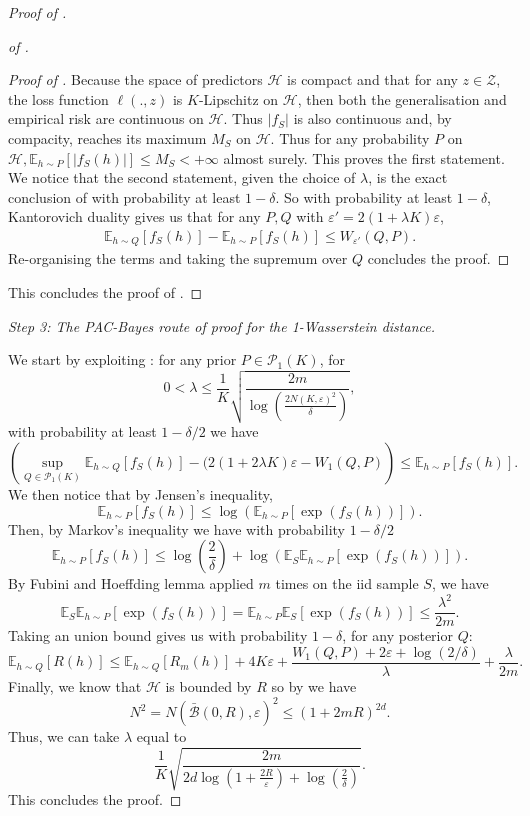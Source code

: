 \begin{proof}[Proof of ]
\begin{proof}[of ]
\begin{lemma}
\end{lemma}
\begin{proof}[Proof of ]
Because the space of predictors $\mathcal{H}$ is compact and that for any $z\in\mathcal{Z}$, the loss function $\ell(.,z)$ is $K$-Lipschitz on $\mathcal{H}$, then both the generalisation and empirical risk are continuous on $\mathcal{H}$. Thus $|f_S|$ is also continuous and, by compacity, reaches its maximum $M_S$ on $\mathcal{H}$. Thus for any probability $P$ on $\mathcal{H}, \mathbb{E}_{h\sim P}[|f_S(h)|] \leq M_S < +\infty$ almost surely. This proves the first statement.
We notice that the second statement, given the choice of $\lambda$, is the exact conclusion  of  with probability at least $1-\delta$.
So with probability at least $1-\delta$, Kantorovich duality gives us that for any $P,Q$ with $\varepsilon'= 2(1+ \lambda K) \varepsilon$,
\begin{align*}
\mathbb{E}_{h\sim Q}[ f_S(h)] - \mathbb{E}_{h\sim P}[f_S(h)] \leq W_{\varepsilon'}(Q,P).
\end{align*}
Re-organising the terms and taking the supremum over $Q$ concludes the proof.
\end{proof}
This concludes the proof of .
\end{proof}

\textit{Step 3: The PAC-Bayes route of proof for the 1-Wasserstein distance.}

We start by exploiting : for any prior $P\in\mathcal{P}_1(K)$, for $$0<\lambda \leq  \frac{1}{K}\sqrt{\frac{2m}{\log\left(\frac{2N(K,\varepsilon)^2}{\delta}\right)}},$$
with probability at least $1-\delta/2$ we have
\[ \left(\sup_{Q\in \mathcal{P}_1(K)} \mathbb{E}_{h\sim Q}[ f_S(h)] - (2(1+2\lambda K)\varepsilon - W_1(Q,P) \right) \leq \mathbb{E}_{h\sim P}[ f_S(h)]. \]
We then notice that by Jensen's inequality,  $$\mathbb{E}_{h\sim P}[ f_S(h)] \leq \log\left(\mathbb{E}_{h\sim P}[ \exp(f_S(h))]    \right).$$
Then, by Markov's inequality we have with probability $1-\delta/2$
\[ \mathbb{E}_{h\sim P}[ f_S(h)] \leq \log\left(\frac{2}{\delta}\right) + \log\left(\mathbb{E}_S\mathbb{E}_{h\sim P}\left[ \exp(f_S(h))   \right]\right).  \]
By Fubini and Hoeffding lemma applied $m$ times on the iid sample $S$, we have
\[ \mathbb{E}_S\mathbb{E}_{h\sim P}\left[ \exp(f_S(h))\right] =  \mathbb{E}_{h\sim P}\mathbb{E}_S\left[ \exp(f_S(h))\right] \leq \frac{\lambda^2}{2m}. \]
Taking an union bound gives us with probability $1-\delta$, for any posterior $Q$:
\[ \mathbb{E}_{h\sim Q}[R(h)] \leq \mathbb{E}_{h\sim Q}[R_m(h)] +   4K\varepsilon + \frac{W_1(Q,P)+2\varepsilon +\log(2/\delta)}{\lambda} + \frac{\lambda}{2m}.   \]
Finally, we know that $\mathcal{H}$ is bounded by $R$ so by  we have $$N^2 = N(\bar{\mathcal{B}}(0,R), \varepsilon)^2 \leq \left(1+ 2mR \right)^{2d}.$$
Thus, we can take $\lambda$ equal to $$\frac{1}{K}\sqrt{\frac{2m}{2d\log(1+\frac{2R}{\varepsilon})+\log(\frac{2}{\delta})}}.$$
This concludes the proof.
\end{proof}






